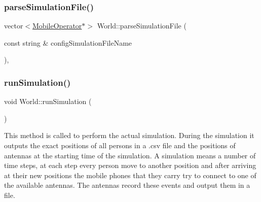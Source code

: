 \mbox{\label{class_world_adef43cc4ccb918aa68c00ee1e3286321}} 
\subsubsection{\texorpdfstring{parse\+Simulation\+File()}{parseSimulationFile()}}
{\footnotesize\ttfamily vector$<$\hyperlink{class_mobile_operator}{Mobile\+Operator}$\ast$$>$ World\+::parse\+Simulation\+File (\begin{DoxyParamCaption}\item[{const string \&}]{config\+Simulation\+File\+Name }\end{DoxyParamCaption})\hspace{0.3cm}{\ttfamily [private]}, {\ttfamily [noexcept]}}

\mbox{\label{class_world_aa825a43f968c8fe750c67156e64721ff}} 
\subsubsection{\texorpdfstring{run\+Simulation()}{runSimulation()}}
{\footnotesize\ttfamily void World\+::run\+Simulation (\begin{DoxyParamCaption}{ }\end{DoxyParamCaption})\hspace{0.3cm}{\ttfamily [noexcept]}}

This method is called to perform the actual simulation. During the simulation it outputs the exact positions of all persons in a .csv file and the positions of antennas at the starting time of the simulation. A simulation means a number of time steps, at each step every person move to another position and after arriving at their new positions the mobile phones that they carry try to connect to one of the available antennas. The antennas record these events and output them in a file. \mbox{\label{class_world_ab517becd3d09009ae4b151a6ce68d073}} 
